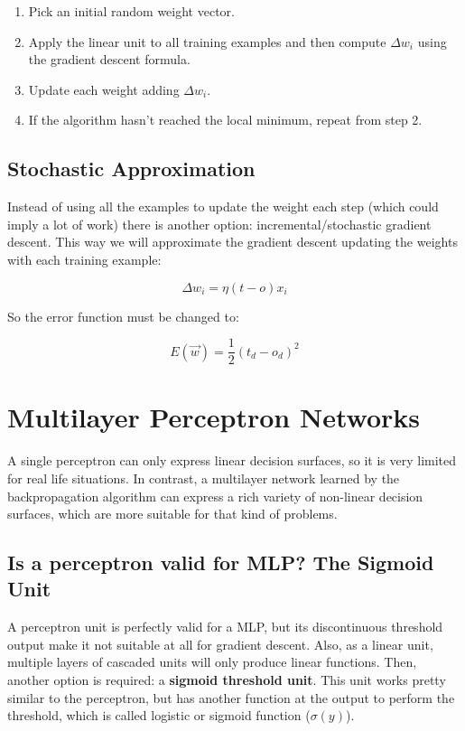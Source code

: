 	\begin{enumerate}

		\item Pick an initial random weight vector.
		\item Apply the linear unit to all training examples and then compute $\Delta w_i$  using the gradient descent formula.
		\item Update each weight adding $\Delta w_i$.
		\item If the algorithm hasn’t reached the local minimum, repeat from step 2.
	
	\end{enumerate}

	\subsection{Stochastic Approximation}
	Instead of using all the examples to update the weight each step (which could imply a lot of work) there is another option: incremental/stochastic gradient descent. This way we will approximate the gradient descent updating the weights with each training example:

	\begin{equation}
		\label{delta_rule}
		\Delta w_{i}= \eta (t - o) x_{i}
	\end{equation}

	So the error function must be changed to:

	\begin{equation}
		\label{error_function_stoc_square}
		E(\vec{w}) = \frac{1}{2} (t_d-o_d)^2 
	\end{equation}

\section{Multilayer Perceptron Networks}
A single perceptron can only express linear decision surfaces, so it is very limited for real life situations. In contrast, a multilayer network learned by the backpropagation algorithm can express a rich variety of non-linear decision surfaces, which are more suitable for that kind of problems.

	\subsection{Is a perceptron valid for MLP? The Sigmoid Unit}
	A perceptron unit is perfectly valid for a MLP, but its discontinuous threshold output make it not suitable at all for gradient descent. Also, as a linear unit, multiple layers of cascaded units will only produce linear functions. Then, another option is required: a \textbf{sigmoid threshold unit}. This unit works pretty similar to the perceptron, but has another function at the output to perform the threshold, which is called logistic or sigmoid function ($\sigma(y)$).

